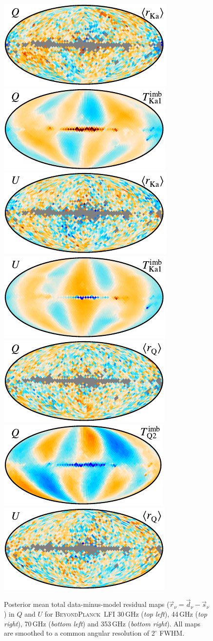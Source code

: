 \documentclass[twocolumn]{aa}
\renewcommand{\d}[0]{\vec{d}}
\newcommand{\s}[0]{\vec{s}}
\renewcommand{\r}[0]{\vec{r}}
\newcommand{\BP}{\textsc{BeyondPlanck}}
\newcommand{\?}[1]{\textcolor{red}{{\bf [#1]}}}
\begin{document}
\begin{figure}[t]
\caption{Posterior mean total data-minus-model residual maps
($\r_{\nu}=\d_{\nu}-\s_{\nu}$) in $Q$ and $U$ for \BP\ LFI 30\,GHz (\textit{top
left}), 44\,GHz (\textit{top right}), 70\,GHz (\textit{bottom left}) and 353\,GHz
(\textit{bottom right}). All maps are smoothed to a common angular resolution of
$2^{\circ}$ FWHM.} 
\label{fig:resplanck}
\vspace*{5mm}
\includegraphics[width=.23\linewidth]{figs/BP_res_033-WMAP_Ka_P_QU_0arcmin_uK_v2_Q_MEAN_w7_n16_masked_c-planck.pdf}
\includegraphics[width=.23\linewidth]{figs/wmap_loss_imbalance_template1_Ka1_v5_iqu_Q_w7_n16_c-planck.pdf}\hspace*{5mm}
\includegraphics[width=.23\linewidth]{figs/BP_res_033-WMAP_Ka_P_QU_0arcmin_uK_v2_U_MEAN_w7_n16_masked_c-planck.pdf}
\includegraphics[width=.23\linewidth]{figs/wmap_loss_imbalance_template1_Ka1_v5_iqu_U_w7_n16_c-planck.pdf}\\
\includegraphics[width=.23\linewidth]{figs/BP_res_041-WMAP_Q_P_QU_0arcmin_uK_v2_Q_MEAN_w7_n16_masked_c-planck.pdf}
\includegraphics[width=.23\linewidth]{figs/wmap_loss_imbalance_template1_Q2_v5_iqu_Q_w7_n16_c-planck.pdf}\hspace*{5mm}
\includegraphics[width=.23\linewidth]{figs/BP_res_041-WMAP_Q_P_QU_0arcmin_uK_v2_U_MEAN_w7_n16_masked_c-planck.pdf}

\end{figure}
\end{document}

